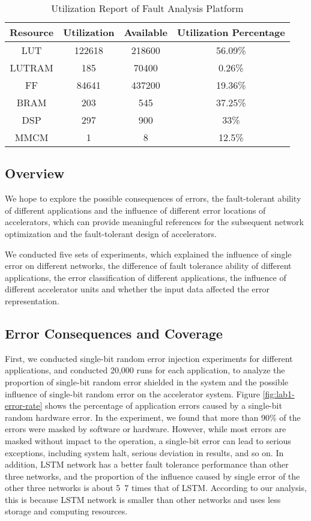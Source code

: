 \begin{table}
    \centering
    \caption{Utilization Report of Fault Analysis Platform}
    \label{tab:utilization report}
    \begin{tabular}{cccc}
        \toprule
        Resource & Utilization & Available & Utilization Percentage \\
        \midrule
            LUT & 122618 & 218600 & 56.09\% \\
            LUTRAM & 185 & 70400 & 0.26\% \\
            FF & 84641 & 437200 & 19.36\% \\
            BRAM & 203 & 545 & 37.25\% \\
            DSP & 297 & 900 & 33\% \\
            MMCM & 1 & 8 & 12.5\% \\
        \bottomrule
    \end{tabular}
\vspace{-1em}
\end{table}

\subsection{Overview}
We hope to explore the possible consequences of errors, the 
fault-tolerant ability of different applications and the 
influence of different error locations of accelerators, 
which can provide meaningful references for the subsequent 
network optimization and the fault-tolerant design of 
accelerators.

We conducted five sets of experiments, which explained the 
influence of single error on different networks, the 
difference of fault tolerance ability of different 
applications, the error classification of different 
applications, the influence of different accelerator units 
and whether the input data affected the error representation.


\subsection{Error Consequences and Coverage}
First, we conducted single-bit random error injection 
experiments for different applications, and conducted 
20,000 runs for each application, to analyze the proportion 
of single-bit random error shielded in the system and the 
possible influence of single-bit random error on the 
accelerator system. Figure \ref{fig:lab1-error-rate} shows the 
percentage of application errors caused by a single-bit 
random hardware error. In the experiment, we found that 
more than 90\% of the errors were masked by software or 
hardware. However, while most errors are masked without 
impact to the operation, a single-bit error can lead to 
serious exceptions, including system halt, serious 
deviation in results, and so on. In addition, LSTM network 
has a better fault tolerance performance than other three 
networks, and the proportion of the influence caused by 
single error of the other three networks is about 5~7 times 
that of LSTM. According to our analysis, this is because 
LSTM network is smaller than other networks and uses less 
storage and computing resources.

